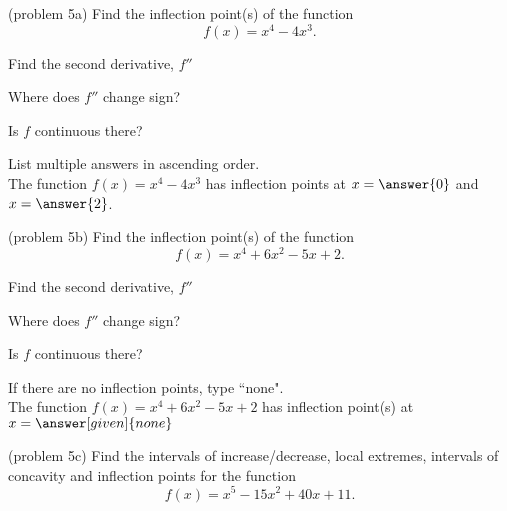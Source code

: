 \documentclass{ximera}
\begin{document}
\begin{problem}(problem 5a)
  Find the inflection point(s) of the function
  \[
     f(x) = x^4 - 4x^3.
  \]
  
    \begin{hint}
      Find the second derivative, $f''$
    \end{hint}
    \begin{hint}
      Where does $f''$ change sign?
    \end{hint}
    \begin{hint}
      Is $f$ continuous there?
    \end{hint}  
		
		List multiple answers in ascending order.\\
		The function $f(x) = x^4 - 4x^3$ has inflection points at 
		$x =\answer{0}$ and $x = \answer{2}$.
		
	
\end{problem}


\begin{problem}(problem 5b)
  Find the inflection point(s) of the function
  \[
     f(x) = x^4 + 6x^2 - 5x + 2.
  \]
  
    \begin{hint}
      Find the second derivative, $f''$
    \end{hint}
    \begin{hint}
      Where does $f''$ change sign?
    \end{hint}
    \begin{hint}
      Is $f$ continuous there?
    \end{hint}  
		If there are no inflection points, type ``none".\\ 
		The function $f(x) = x^4 + 6x^2 - 5x + 2$ has inflection 
		point(s) at $x =\answer[given]{none}$
	
\end{problem}

\begin{problem}(problem 5c) Find the intervals of increase/decrease, local extremes, intervals of concavity and inflection points for the function
\[
f(x) = x^5 - 15x^2 + 40x + 11.
\]
\end{problem}
\end{document}
